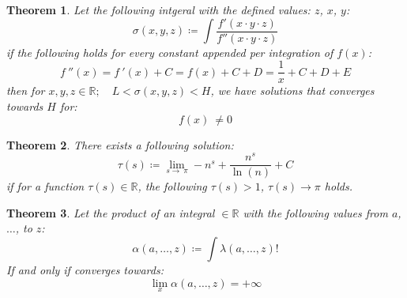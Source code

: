 \documentclass[10pt, twocolumn]{article}
\theoremstyle{plain}
\newtheorem{theorem}{Theorem}[section]
\theoremstyle{definition}
\theoremstyle{remark}
\begin{document}
\begin{theorem}
  Let the following intgeral with the defined values: $z$, $x$, $y$:
  \begin{equation}
    \sigma(x, y, z) \coloneq \int \frac{f'(x \cdot y \cdot z)}{f''(x \cdot y \cdot z)}
  \end{equation}
  if the following holds for every constant appended per integration of $f(x)$:
  \begin{equation}
    f\:''\left(x\right)= f\:'\left(x\right)+C=f\left(x\right)+C + D=\frac{1}{x} + C + D + E
  \end{equation}
  then for $x, y, z \in \mathbb{R}; \quad L < \sigma(x, y, z) < H$, we have solutions that converges towards $H$ for:
  \begin{equation}
    f\left(x\right)\:\ne 0
  \end{equation}
\end{theorem}

\begin{theorem}
  There exists a following solution:
  \begin{equation}
    \tau (s) \coloneq \lim _{s\to \:\pi } -n^s+\frac{n^s}{\ln \left(n\right)}+C
  \end{equation}
  if for a function $\tau (s) \in \mathbb{R}$, the following $\tau (s) > 1$, $\tau (s) \to \pi$ holds.
\end{theorem}

\begin{theorem}
  Let the product of an integral $\in \mathbb{R}$ with the following values from $a$, $\dots$, to $z$:
  \begin{equation}
    \alpha(a, \dots, z) \coloneq \int \lambda(a, \dots, z)! 
  \end{equation}
  If and only if converges towards:
  \begin{equation}
    \lim_{x} \alpha(a, \dots, z) = +\infty
  \end{equation}
\end{theorem}
\end{document}
